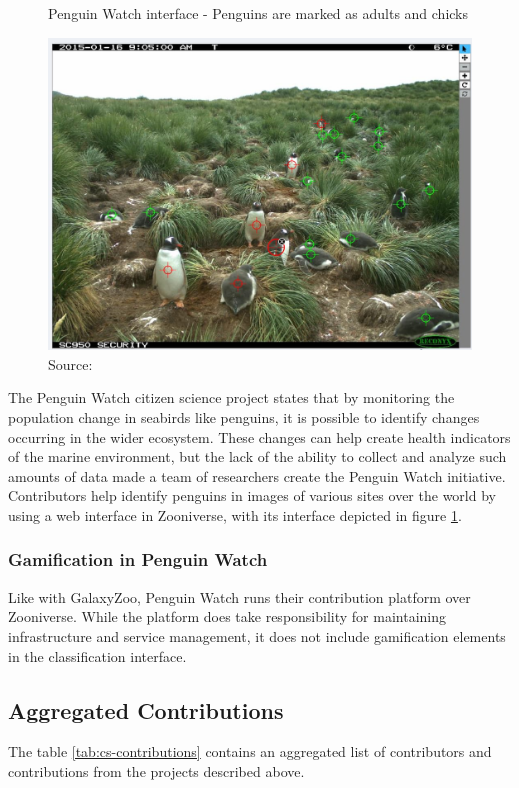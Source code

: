 \begin{figure}[ht]
    \centering
    \caption{Penguin Watch interface - Penguins are marked as adults and chicks}
    \includegraphics[width=0.8\linewidth]{images/background/penguinwatch.jpg}
    \caption*{Source: \cite{penguin2015watch}}
    \label{fig:penguin-watch}
\end{figure}

The Penguin Watch citizen science project states that by monitoring the population change in seabirds like penguins, it is possible to identify changes occurring in the wider ecosystem. These changes can help create health indicators of the marine environment, but the lack of the ability to collect and analyze such amounts of data made a team of researchers create the Penguin Watch initiative. Contributors help identify penguins in images of various sites over the world by using a web interface in Zooniverse, with its interface depicted in figure \ref{fig:penguin-watch}.

\subsubsection{Gamification in Penguin Watch}

Like with GalaxyZoo, Penguin Watch runs their contribution platform over Zooniverse. While the platform does take responsibility for maintaining infrastructure and service management, it does not include gamification elements in the classification interface.

\subsection{Aggregated Contributions}

The table \ref{tab:cs-contributions} contains an aggregated list of contributors and contributions from the projects described above.


